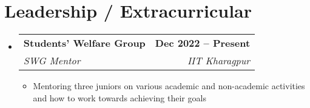 \documentclass[letterpaper,9pt]{article}
\makeatletter
\newcommand{\resumeItem}[1]{
  \item\small{
    {#1 \vspace{-2pt}}
  }
}
\newcommand{\resumeSubheading}[4]{
  \vspace{-2pt}\item
    \begin{tabular*}{1.0\textwidth}[t]{l@{\extracolsep{\fill}}r}
      \textbf{#1} & \textbf{\small #2} \\
      \textit{\small#3} & \textit{\small #4} \\
    \end{tabular*}\vspace{-7pt}
}
\newcommand{\resumeSubHeadingListStart}{\begin{itemize}[leftmargin=0.0in, label={}]}
\newcommand{\resumeSubHeadingListEnd}{\end{itemize}}
\newcommand{\resumeItemListStart}{\begin{itemize}}
\newcommand{\resumeItemListEnd}{\end{itemize}\vspace{-5pt}}
\makeatother
\begin{document}
\section{Leadership / Extracurricular}
  \resumeSubHeadingListStart
    
    \resumeSubheading{Students' Welfare Group}{Dec 2022 -- Present}{SWG Mentor}{IIT Kharagpur}
      \resumeItemListStart
        \resumeItem{Mentoring three juniors on various academic and non-academic activities and how to work towards achieving their goals}
      \resumeItemListEnd
      
  \resumeSubHeadingListEnd
\end{document}
